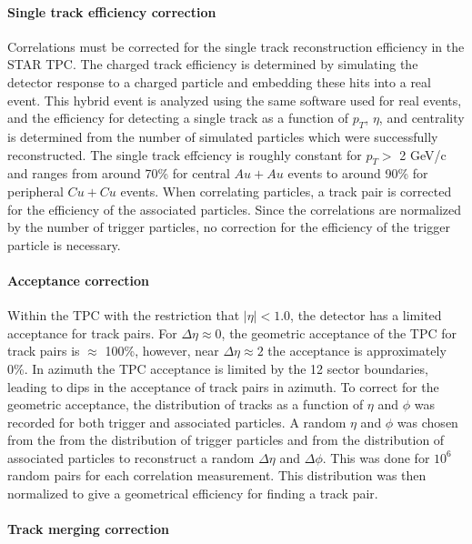 \documentclass[aps,prc,twocolumn,groupedaddress,showpacs,preprintnumbers,amsmath,amssymb]{revtex4}
\newcommand{\pT}{$p_T$\xspace}
\newcommand{\Cu}{$Cu+Cu$\xspace}
\newcommand{\Au}{$Au+Au$\xspace}
\newcommand{\GeV}{GeV/c\xspace}
\newcommand{\dphi}{$\Delta\phi$\xspace}
\newcommand{\deta}{$\Delta\eta$\xspace}
\newcommand{\roughly}{$\approx$\xspace}
\begin{document}
\paragraph*{Single track efficiency correction}
Correlations must be corrected for the single track reconstruction efficiency in the STAR TPC.  The charged track efficiency is determined by simulating the detector response to a charged particle and embedding these hits into a real event.  This hybrid event is analyzed using the same software used for real events, and the efficiency for detecting a single track as a function of \pT, $\eta$, and centrality is determined from the number of simulated particles which were successfully reconstructed.  The single track effciency is roughly constant for \pT $>$ 2 \GeV and ranges from around 70\% for central \Au events to around 90\% for peripheral \Cu events.  When correlating particles, a track pair is corrected for the efficiency of the associated particles.  Since the correlations are normalized by the number of trigger particles, no correction for the efficiency of the trigger particle is necessary.

\paragraph*{Acceptance correction}
Within the TPC with the restriction that $|\eta|<1.0$, the detector has a limited acceptance for track pairs.  For \deta \roughly $0$, the geometric acceptance of the TPC for track pairs is \roughly 100\%, however, near \deta \roughly $2$ the acceptance is approximately 0\%.  In azimuth the TPC acceptance is limited by the 12 sector boundaries, leading to dips in the acceptance of track pairs in azimuth.  To correct for the geometric acceptance, the distribution of tracks as a function of $\eta$ and $\phi$ was recorded for both trigger and associated particles.  A random $\eta$ and $\phi$ was chosen from the from the distribution of trigger particles and from the distribution of associated particles to reconstruct a random \deta and \dphi.  This was done for $10^6$ random pairs for each correlation measurement.  This distribution was then normalized to give a geometrical efficiency for finding a track pair.

\paragraph*{Track merging correction}
\end{document}
